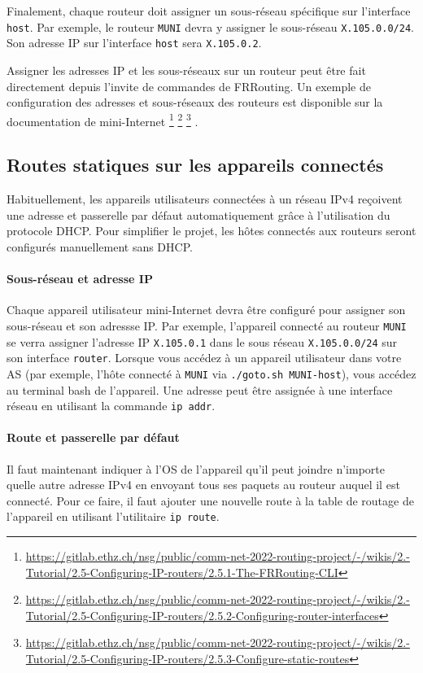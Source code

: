 \documentclass[a4paper, 11pt]{article}
\begin{document}
Finalement, chaque routeur doit assigner un sous-réseau spécifique sur
l'interface \texttt{host}. Par exemple,
le routeur \texttt{MUNI} devra y assigner le sous-réseau
\texttt{X.105.0.0/24}. Son adresse IP sur l'interface \texttt{host}
sera \texttt{X.105.0.2}.

Assigner les adresses IP et les sous-réseaux sur un routeur
peut être fait directement depuis l'invite de commandes
de FRRouting. Un exemple de configuration des adresses
et sous-réseaux des routeurs est disponible sur la
documentation de
mini-Internet
\footnote{\url{https://gitlab.ethz.ch/nsg/public/comm-net-2022-routing-project/-/wikis/2.-Tutorial/2.5-Configuring-IP-routers/2.5.1-The-FRRouting-CLI}}
\footnote{\url{https://gitlab.ethz.ch/nsg/public/comm-net-2022-routing-project/-/wikis/2.-Tutorial/2.5-Configuring-IP-routers/2.5.2-Configuring-router-interfaces}}
\footnote{\url{https://gitlab.ethz.ch/nsg/public/comm-net-2022-routing-project/-/wikis/2.-Tutorial/2.5-Configuring-IP-routers/2.5.3-Configure-static-routes}}
.
\subsection{Routes statiques sur les appareils connectés}

Habituellement, les appareils utilisateurs connectées à un réseau
IPv4 reçoivent une adresse et passerelle par défaut automatiquement
grâce à l'utilisation du protocole DHCP. Pour simplifier le projet,
les hôtes connectés aux routeurs seront configurés manuellement
sans DHCP. 

\paragraph*{Sous-réseau et adresse IP} 
Chaque appareil utilisateur mini-Internet devra
être configuré pour assigner son sous-réseau et son adressse IP.
Par exemple, l'appareil connecté au routeur \texttt{MUNI} se verra
assigner l'adresse IP \texttt{X.105.0.1} dans le sous réseau
\texttt{X.105.0.0/24} sur son interface \texttt{router}.
Lorsque vous accédez à un appareil utilisateur dans votre AS
(par exemple, l'hôte connecté à \texttt{MUNI} via
\texttt{./goto.sh MUNI-host}), vous accédez au terminal
bash de l'appareil.
Une adresse peut être assignée à une interface réseau en utilisant
la commande \texttt{ip addr}.

\paragraph*{Route et passerelle par défaut}
Il faut maintenant indiquer à l'OS de l'appareil qu'il peut joindre
n'importe quelle autre adresse IPv4 en envoyant tous ses paquets
au routeur auquel il est connecté. Pour ce faire, il faut ajouter une
nouvelle route à la table de routage de l'appareil en utilisant
l'utilitaire \texttt{ip route}.
\end{document}

